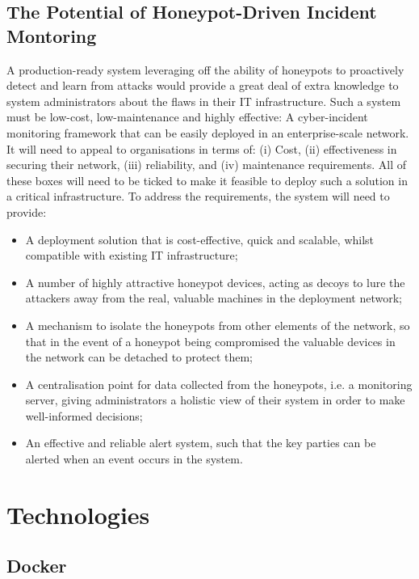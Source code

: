 	\subsection{The Potential of Honeypot-Driven Incident Montoring}
	A production-ready system leveraging off the ability of honeypots to proactively detect and learn from attacks would provide a great deal of extra knowledge to system administrators about the flaws in their IT infrastructure. Such a system must be low-cost, low-maintenance and highly effective: A cyber-incident monitoring framework that can be easily deployed in an enterprise-scale network. It will need to appeal to organisations in terms of: (i) Cost, (ii) effectiveness in securing their network, (iii) reliability, and (iv) maintenance requirements. All of these boxes will need to be ticked to make it feasible to deploy such a solution in a critical infrastructure. To address the requirements, the system will need to provide: 
	
	\begin{itemize}
		\item A deployment solution that is cost-effective, quick and scalable, whilst compatible with existing IT infrastructure; 
		
		\item A number of highly attractive honeypot devices, acting as decoys to lure the attackers away from the real, valuable machines in the deployment network; 
		
		\item A mechanism to isolate the honeypots from other elements of the network, so that in the event of a honeypot being compromised the valuable devices in the network can be detached to protect them; 
		
		\item A centralisation point for data collected from the honeypots, i.e. a monitoring server, giving administrators a holistic view of their system in order to make well-informed decisions; 
		
		\item An effective and reliable alert system, such that the key parties can be alerted when an event occurs in the system.
		
	\end{itemize}

\section{Technologies}
	\subsection{Docker}
	
